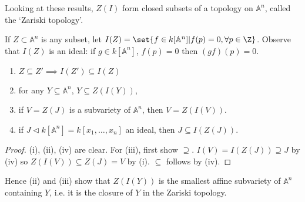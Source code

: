 \documentclass{article}
\newcommand{\A}{\mathbb{A}}
\begin{document}
Looking at these results, $Z(I)$ form closed subsets of a topology on $\A^n$, called the \hypertarget{def:zariski}{`Zariski topology'}.

If $Z \subset \A^n$ is any subset, let $I(Z) = \set{f \in k[\A^n] | f(p) = 0, \forall p \in \Z}$.
Observe that $I(Z)$ is an ideal: if $g \in k[\A^n]$, $f(p) = 0$ then $(gf)(p) = 0$.
\begin{lemma}
    \leavevmode
    \begin{enumerate}[label=(\roman*)]
        \item $Z \subseteq Z' \implies I(Z') \subseteq I(Z)$
        \item for any $Y \subseteq \A^n$, $Y \subseteq Z(I(Y))$,
        \item if $V = Z(J)$ is a subvariety of $\A^n$, then $V = Z(I(V))$.
        \item if $J \lhd k[\A^n] = k[x_1, \dotsc, x_n]$ an ideal, then $J \subseteq I(Z(J))$.
    \end{enumerate}
\end{lemma}
\begin{proof}
    (i), (ii), (iv) are clear.
    For (iii), first show $\supseteq$. $I(V) = I(Z(J))\supseteq J$ by (iv) so $Z(I(V)) \subseteq Z(J)=V$ by (i). $\subseteq$ follows by (iv).
\end{proof}
Hence (ii) and (iii) show that $Z(I(Y))$ is the smallest affine subvariety of $\A^n$ containing $Y$, i.e. it is the closure of $Y$ in the Zariski topology.
\end{document}
